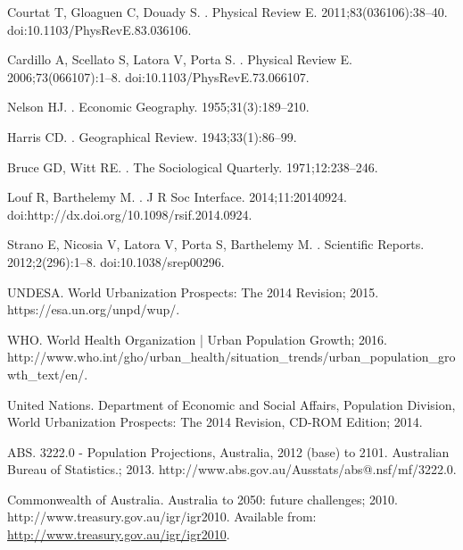 Courtat T, Gloaguen C, Douady S.
.
\newblock Physical Review E. 2011;83(036106):38--40.
\newblock doi:{10.1103/PhysRevE.83.036106}.

Cardillo A, Scellato S, Latora V, Porta S.
.
\newblock Physical Review E. 2006;73(066107):1--8.
\newblock doi:{10.1103/PhysRevE.73.066107}.

Nelson HJ.
.
\newblock Economic Geography. 1955;31(3):189--210.

Harris CD.
.
\newblock Geographical Review. 1943;33(1):86--99.

Bruce GD, Witt RE.
.
\newblock The Sociological Quarterly. 1971;12:238--246.

Louf R, Barthelemy M.
.
\newblock J R Soc Interface. 2014;11:20140924.
\newblock doi:{http://dx.doi.org/10.1098/rsif.2014.0924}.

Strano E, Nicosia V, Latora V, Porta S, Barthelemy M.
.
\newblock Scientific Reports. 2012;2(296):1--8.
\newblock doi:{10.1038/srep00296}.


UNDESA. {World Urbanization Prospects: The 2014 Revision}; 2015.
\newblock https://esa.un.org/unpd/wup/.

WHO. {World Health Organization | Urban Population Growth}; 2016.
\newblock
  http://www.who.int/gho/urban{\_}health/situation{\_}trends/urban{\_}population{\_}growth{\_}text/en/.

{United Nations}. {Department of Economic and Social Affairs, Population
  Division, World Urbanization Prospects: The 2014 Revision, CD-ROM Edition};
  2014.

ABS. {3222.0 - Population Projections, Australia, 2012 (base) to 2101.
  Australian Bureau of Statistics.}; 2013.
\newblock http://www.abs.gov.au/Ausstats/abs@.nsf/mf/3222.0.

{Commonwealth of Australia}. {Australia to 2050: future challenges}; 2010.
\newblock http://www.treasury.gov.au/igr/igr2010.
\newblock Available from: \url{http://www.treasury.gov.au/igr/igr2010}.

